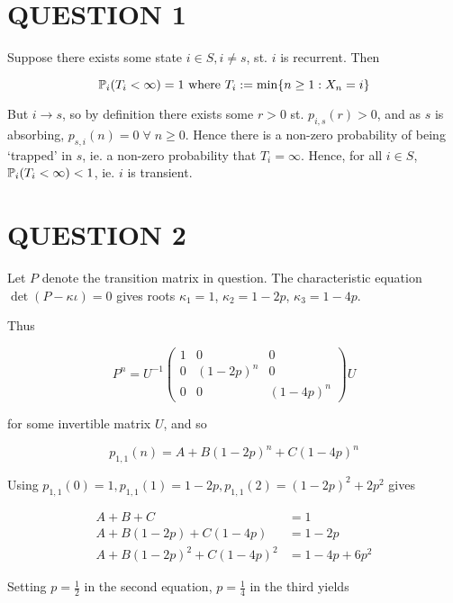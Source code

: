 \documentclass[a4paper]{article}
\begin{document}
	
\maketitle

\section{QUESTION 1}

Suppose there exists some state $ i \in S, i \neq s $, st. $ i $ is recurrent. Then

 \[ \P_{i}(T_{i} < \infty ) = 1 \text{ where } T_{i} := \min \{  n \geq  1 : X_{n} = i \}  \]
 
 But $ i \to s $, so by definition there exists some $ r > 0 $ st. $ p_{i,s}(r) > 0 $, and as $ s $ is absorbing, $ p_{s,i}(n) = 0 \; \forall \;  n \geq 0$. Hence there is a non-zero probability of being `trapped' in $ s $, ie. a non-zero probability that $ T_{i} = \infty $. 
 Hence, for all $ i \in S $, $ \P_{i}(T_{i} < \infty) < 1$, ie. $ i $ is transient. 



\section{QUESTION 2}

Let $ P $ denote the transition matrix in question. The characteristic equation $ \det(P - \kappa \iota ) = 0 $ gives roots $ \kappa_{1} = 1 $, $ \kappa_{2} = 1 - 2p $, $ \kappa_{3} = 1 - 4p $. 

Thus 

\[ P^{n} = U^{-1} \begin{pmatrix}
1 & 0 & 0 \\
0 & (1-2p)^{n} & 0 \\
0 & 0 & (1 - 4p)^{n}
\end{pmatrix} U  \]

for some invertible matrix $ U $, and so

\[ p_{1,1}(n) = A + B(1-2p)^{n} + C(1-4p)^{n} \]

Using $ p_{1,1}(0) = 1, p_{1,1}(1) = 1 - 2p, p_{1,1}(2) = (1-2p)^{2} + 2p^{2} $ gives

\begin{align*}
A + B + C & = 1 \\
A + B(1-2p) + C(1-4p) & = 1 - 2p \\
A + B(1-2p)^{2} + C(1-4p)^{2} & = 1 - 4p + 6p^{2} 
\end{align*}

Setting $ p = \frac{1}{2} $ in the second equation, $ p = \frac{1}{4} $ in the third yields
\end{document}
